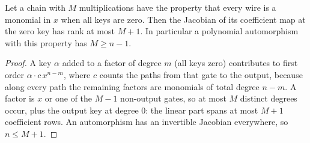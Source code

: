 \begin{proposition}
\label{prop:centering}
Let a chain with $M$ multiplications have the property that every wire is a
monomial in $x$ when all keys are zero.  Then the Jacobian of its coefficient
map at the zero key has rank at most $M+1$.  In particular a polynomial
automorphism with this property has $M\ge n-1$.
\end{proposition}

\begin{proof}
A key $\alpha$ added to a factor of degree $m$ (all keys zero) contributes to
first order $\alpha\cdot c\,x^{n-m}$, where $c$ counts the paths from that
gate to the output, because along every path the remaining factors are
monomials of total degree $n-m$.  A factor is $x$ or one of the $M-1$
non-output gates, so at most $M$ distinct degrees occur, plus the output key at
degree $0$: the linear part spans at most $M+1$ coefficient rows.  An
automorphism has an invertible Jacobian everywhere, so $n\le M+1$.
\end{proof}

